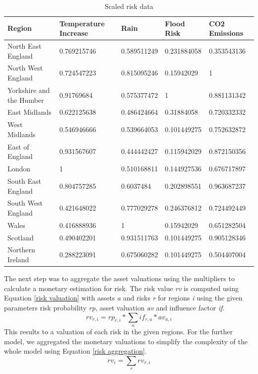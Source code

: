 \documentclass[10pt,a4paper]{article}
\begin{document}
    \begin{table}[H]
    \centering
    \begin{tabular}{|l|l|l|l|l|}
    \hline
    Region                   & Temperature   Increase & Rain        & Flood Risk  & CO2 Emissions \\ \hline
    North East England       & 0.769215746            & 0.589511249 & 0.231884058 & 0.353543136   \\ \hline
    North West England       & 0.724547223            & 0.815095246 & 0.15942029  & 1             \\ \hline
    Yorkshire and the Humber & 0.91769684             & 0.575377472 & 1           & 0.881131342   \\ \hline
    East Midlands            & 0.622125638            & 0.486424664 & 0.31884058  & 0.720332332   \\ \hline
    West Midlands            & 0.546946666            & 0.539664053 & 0.101449275 & 0.752632872   \\ \hline
    East of England          & 0.931567607            & 0.444442427 & 0.115942029 & 0.872150356   \\ \hline
    London                   & 1                      & 0.510168811 & 0.144927536 & 0.676717897   \\ \hline
    South East England       & 0.804757285            & 0.6037484   & 0.202898551 & 0.963687237   \\ \hline
    South West England       & 0.421648022            & 0.777029278 & 0.246376812 & 0.724492449   \\ \hline
    Wales                    & 0.416888936            & 1           & 0.15942029  & 0.651282504   \\ \hline
    Scotland                 & 0.490402201            & 0.931511763 & 0.101449275 & 0.905128346   \\ \hline
    Northern Ireland         & 0.288223091            & 0.675060282 & 0.101449275 & 0.504407004   \\ \hline
    \end{tabular}
    \caption{Scaled risk data}
    \label{scaled risk}
    \end{table}
    
    The next step was to aggregate the asset valuations using the multipliers to calculate a monetary estimation for risk. The risk value \textit{rv} is computed using Equation \ref{risk valuation} with assets \textit{a} and risks \textit{r} for regions \textit{i} using the given parameters risk probability \textit{rp}, asset valuation \textit{av} and influence factor \textit{if}.
    \begin{equation}
        rv_{r,i} = rp_{r,i}*\sum_{a}{if_{r,a}*av_{a,i}}
        \label{risk valuation}
    \end{equation}
    This results to a valuation of each risk in the given regions. For the further model, we aggregated the monetary valuations to simplify the complexity of the whole model using Equation \ref{risk aggregation}.
    \begin{equation}
        rv_{i} = \sum_{r}{rv_{r,i}}
        \label{risk aggregation}
    \end{equation}
\end{document}
